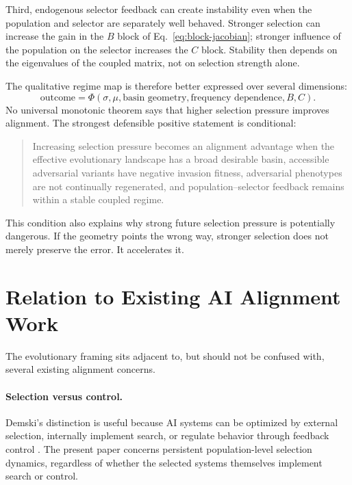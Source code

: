 \documentclass[11pt]{article}
\begin{document}
Third, endogenous selector feedback can create instability even when the population and selector are separately well behaved. Stronger selection can increase the gain in the $B$ block of Eq.~\eqref{eq:block-jacobian}; stronger influence of the population on the selector increases the $C$ block. Stability then depends on the eigenvalues of the coupled matrix, not on selection strength alone.

The qualitative regime map is therefore better expressed over several dimensions:
\begin{equation}
    \text{outcome}
    =
    \Phi(\sigma,\mu,\text{basin geometry},\text{frequency dependence},B,C).
\end{equation}
No universal monotonic theorem says that higher selection pressure improves alignment. The strongest defensible positive statement is conditional:

\begin{quote}
Increasing selection pressure becomes an alignment advantage when the effective evolutionary landscape has a broad desirable basin, accessible adversarial variants have negative invasion fitness, adversarial phenotypes are not continually regenerated, and population--selector feedback remains within a stable coupled regime.
\end{quote}

This condition also explains why strong future selection pressure is potentially dangerous. If the geometry points the wrong way, stronger selection does not merely preserve the error. It accelerates it.

\section{Relation to Existing AI Alignment Work}

The evolutionary framing sits adjacent to, but should not be confused with, several existing alignment concerns.

\paragraph{Selection versus control.}
Demski's distinction is useful because AI systems can be optimized by external selection, internally implement search, or regulate behavior through feedback control \parencite{demski2019}. The present paper concerns persistent population-level selection dynamics, regardless of whether the selected systems themselves implement search or control.
\end{document}
